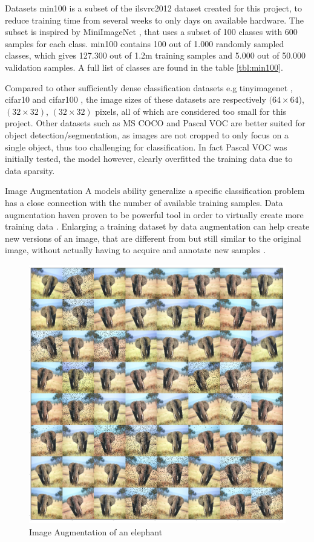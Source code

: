 \begin{enumdescript}
\begin{enumdescript}
		\item[Datasets] \gls{min100} is a subset of the \gls{ilsvrc2012} dataset \cite{russakovsky_imagenet_2015} created for this project, to reduce training time from several weeks to only days on available hardware. The subset is inspired by MiniImageNet \cite{vinyals_matching_2016}, that uses a subset of 100 classes with 600 samples for each class. \gls{min100} contains 100 out of 1.000 randomly sampled classes, which gives 127.300 out of 1.2m training samples and 5.000 out of 50.000 validation samples. A full list of classes are found in the table \ref{tbl:min100}. 
		
		Compared to other sufficiently dense classification datasets e.g \gls{tinyimagenet} \cite{li_cs231n:_2018}, \gls{cifar10} and \gls{cifar100} \cite{krizhevsky_cifar-10_nodate}, the image sizes of these datasets are respectively $(64\times 64$), $(32\times 32)$, $(32\times 32)$ pixels, all of which are considered too small for this project. Other datasets such as MS COCO and Pascal VOC are better suited for object detection/segmentation, as images are not cropped to only focus on a single object, thus too challenging for classification. In fact Pascal VOC was initially tested, the model however, clearly overfitted the training data due to data sparsity. 
		
		\item[Image Augmentation] A models ability generalize a specific classification problem has a close connection with the number of available training samples. Data augmentation haven proven to be powerful tool in order to virtually create more training data \cite{perez_effectiveness_2017}. Enlarging a training dataset by data augmentation can help create new versions of an image, that are different from but still similar to the original image, without actually having to acquire and annotate new samples \cite{goodfellow_deep_2016}.  
		
		\begin{figure}[H]
			\centering
			\includegraphics[width=.7\linewidth]{figures/augmentation/augmentation_high_resolution.png}
			\caption[Image Augmentaion Example]{Image Augmentation of an elephant}
			\label{fig:augmentation}
		\end{figure}
		

\end{enumdescript}
\end{enumdescript}
